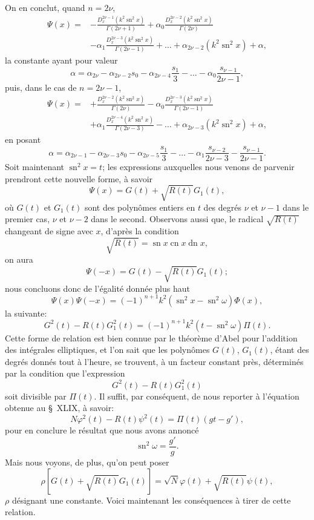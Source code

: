 \documentclass[11pt,leqno,oneside,letterpaper]{book}[2005/09/16]
\DeclareMathOperator{\sn}{sn}
\DeclareMathOperator{\cn}{cn}
\DeclareMathOperator{\dn}{dn}
\begin{document}
On en conclut, quand $n = 2\nu$,
\begin{align*}
  \Psi(x) = &-\frac{D_x^{2\nu-1}(k^2\sn^2x)}{\Gamma(2\nu+1)} +
            \alpha_0\frac{D_x^{2\nu-2}(k^2\sn^2x)}{\Gamma(2\nu)} \\
            &-\alpha_1\frac{D_x^{2\nu-3}(k^2\sn^2x)}{\Gamma(2\nu-1)} + \ldots +
            \alpha_{2\nu-2}(k^2\sn^2x)+ \alpha,
\end{align*}
la constante ayant pour valeur
\[
\alpha = \alpha_{2\nu} - \alpha_{2\nu-2}s_0 - \alpha_{2\nu-4}\frac{s_1}{3}
         - \ldots - \alpha_0\frac{s_{\nu-1}}{2\nu-1},
\]
puis, dans le cas de $n = 2\nu-1$,
\begin{align*}
  \Psi(x) = & + \frac{D_x^{2\nu-2}(k^2\sn^2x)}{\Gamma(2\nu)} -
            \alpha_0\frac{D_x^{2\nu-3}(k^2\sn^2x)}{\Gamma(2\nu-1)} \\
            & + \alpha_1\frac{D_x^{2\nu-4}(k^2\sn^2x)}{\Gamma(2\nu-3)} - \ldots +
            \alpha_{2\nu-3}(k^2\sn^2x) + \alpha,
\end{align*}
en posant
\[
\alpha = \alpha_{2\nu-1} - \alpha_{2\nu-3}s_0 - \alpha_{2\nu-5}\frac{s_1}{3}
         - \ldots - \alpha_1\frac{s_{\nu-2}}{2\nu-3} - \frac{s_{\nu-1}}{2\nu-1}.
\]
Soit maintenant $\sn^2x=t$; les expressions auxquelles nous venons de
parvenir prendront cette nouvelle forme, \`a savoir
\[
\Psi(x) = G(t) + \sqrt{R(t)}G_1(t),
\]
o\`u $G(t)$ et $G_1(t)$ sont des polyn\^omes entiers en $t$ des degr\'es $\nu$ et $\nu-1$ dans
le premier cas, $\nu$ et $\nu-2$ dans le second. Observons aussi que, le radical
$\sqrt{R(t)}$ changeant de signe avec $x$, d'apr\`es la condition
\[
\sqrt{R(t)} = \sn x\cn x\dn x,
\]
on aura
\[
\Psi(-x) = G(t) - \sqrt{R(t)}G_1(t);
\]
nous concluons donc de l'\'egalit\'e donn\'ee plus haut
\[
\Psi(x)\Psi(-x) = (-1)^{n+1}k^2
  \left(\sn^2x-\sn^2\omega\right) \Phi(x),
\]
la suivante:
\[
G^2(t) - R(t)G_1^2(t) = (-1)^{n+1}k^2
  \left(t-\sn^2\omega\right) \Pi(t).
\]
Cette forme de relation est bien connue par le th\'eor\`eme d'Abel pour l'addition
des int\'egrales elliptiques, et l'on sait que les polyn\^omes $G(t)$,
$G_1(t)$, \'etant des degr\'es donn\'es tout \`a l'heure, se trouvent, \`a un facteur
constant pr\`es, d\'etermin\'es par la condition que l'expression
\[
G^2(t) - R(t)G_1^2(t)
\]
soit divisible par $\Pi(t)$. Il suffit, par cons\'equent, de nous reporter \`a l'\'equation
obtenue au \S~XLIX, \`a savoir:
\[
N\varphi^2(t) - R(t)\psi^2(t) = \Pi(t) \left(gt-g'\right),
\]
pour en conclure le r\'esultat que nous avons annonc\'e
\[
\sn^2\omega = \frac{g'}{g}.
\]
Mais nous voyons, de plus, qu'on peut poser
\[
\rho\left[G(t) + \sqrt{R(t)}G_1(t)\right] =
  \sqrt{N}\varphi(t) + \sqrt{R(t)}\psi(t),
\]
$\rho$ d\'esignant une constante. Voici maintenant les cons\'equences \`a tirer de
cette relation.
\end{document}
